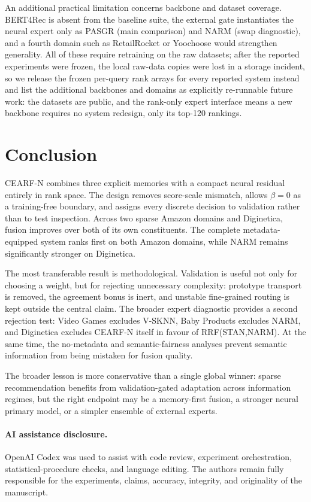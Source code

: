 \documentclass[runningheads]{llncs}
\newcommand{\method}{CEARF-N}
\begin{document}
An additional practical limitation concerns backbone and dataset coverage.
BERT4Rec is absent from the baseline suite, the external gate instantiates
the neural expert only as PASGR (main comparison) and NARM (swap diagnostic),
and a fourth domain such as RetailRocket or Yoochoose would strengthen
generality. All of these require retraining on the raw datasets; after the
reported experiments were frozen, the local raw-data copies were lost in a
storage incident, so we release the frozen per-query rank arrays for every
reported system instead and list the additional backbones and domains as
explicitly re-runnable future work: the datasets are public, and the rank-only
expert interface means a new backbone requires no system redesign, only its
top-120 rankings.

\section{Conclusion}
\method{} combines three explicit memories with a compact neural residual
entirely in rank space. The design removes score-scale mismatch, allows
$\beta=0$ as a training-free boundary, and assigns every discrete decision to
validation rather than to test inspection. Across two sparse Amazon domains
and Diginetica, fusion improves over both of its own constituents. The
complete metadata-equipped system ranks first on both Amazon domains, while
NARM remains significantly stronger on Diginetica.

The most transferable result is methodological. Validation is useful not only
for choosing a weight, but for rejecting unnecessary complexity: prototype
transport is removed, the agreement bonus is inert, and unstable fine-grained
routing is kept outside the central claim. The broader expert diagnostic
provides a second rejection test: Video Games excludes V-SKNN, Baby Products
excludes NARM, and Diginetica excludes \method{} itself in favour of
RRF(STAN,NARM). At the same time, the no-metadata and semantic-fairness
analyses prevent semantic information from being mistaken for fusion quality.

The broader lesson is more conservative than a single global winner: sparse
recommendation benefits from validation-gated adaptation across information
regimes, but the right endpoint may be a memory-first fusion, a stronger
neural primary model, or a simpler ensemble of external experts.

\paragraph{AI assistance disclosure.}
OpenAI Codex was used to assist with code review, experiment orchestration,
statistical-procedure checks, and language editing. The authors remain fully
responsible for the experiments, claims, accuracy, integrity, and originality
of the manuscript.



\end{document}
